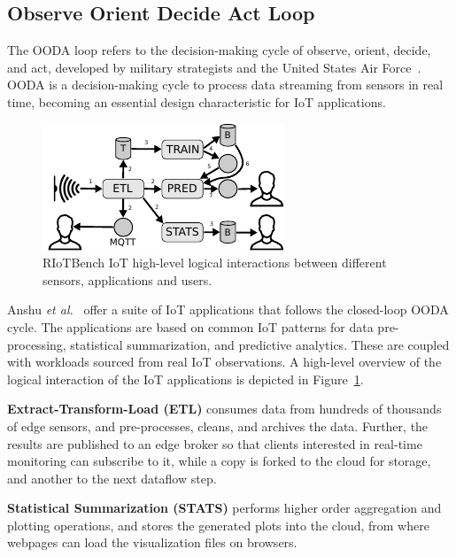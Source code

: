 \subsection{Observe Orient Decide Act Loop}

The \ac{OODA} loop refers to the decision-making cycle of observe, orient, decide, and act, developed by military strategists and the United States Air Force~\cite{OODA}. \ac{OODA} is a decision-making cycle to process data streaming from sensors in real time, becoming an essential design characteristic for IoT applications. 
\begin{figure}[h!]
  \centering
  \includegraphics[width=0.8\columnwidth]{Figures/ooda.pdf}
  \caption{RIoTBench IoT high-level logical interactions between different sensors, applications and users.}
  \label{fig:etl}
\end{figure}

Anshu \textit{et al.}~\cite{RIoTBench} offer a suite of IoT applications that follows the closed-loop \ac{OODA} cycle. The applications are based on common IoT patterns for data pre-processing, statistical summarization, and predictive analytics. These are coupled with workloads sourced from real IoT observations. A high-level overview of the logical interaction of the IoT applications is depicted in Figure~\ref{fig:etl}.

\textbf{Extract-Transform-Load (ETL)} consumes data from hundreds of thousands of edge sensors, and pre-processes, cleans, and archives the data. Further, the results are published to an edge broker so that clients interested in real-time monitoring can subscribe to it, while a copy is forked to the cloud for storage, and another to the next dataflow step.

\textbf{Statistical Summarization (STATS)} performs higher order aggregation and plotting operations, and stores the generated plots into the cloud, from where webpages can load the visualization files on browsers. 

